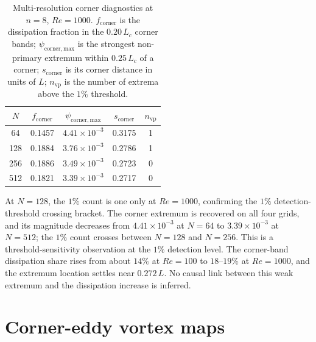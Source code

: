 \documentclass[11pt]{article}
\begin{document}
\begin{table}[H]
\centering
\caption{Multi-resolution corner diagnostics at $n=8$, $Re=1000$.
$f_{\mathrm{corner}}$ is the dissipation fraction in the $0.20\,L_c$ corner
bands; $\psi_{\mathrm{corner,max}}$ is the strongest non-primary extremum within
$0.25\,L_c$ of a corner; $s_{\mathrm{corner}}$ is its corner distance in units
of $L$; $n_{\mathrm{vp}}$ is the number of extrema above the $1\%$ threshold.}




\label{tab:cornerdiag}
\begin{tabular}{ccccc}
\toprule
$N$ & $f_{\mathrm{corner}}$ & $\psi_{\mathrm{corner,max}}$ & $s_{\mathrm{corner}}$ & $n_{\mathrm{vp}}$ \\
\midrule
64 & 0.1457 & $4.41\times10^{-3}$ & 0.3175 & 1 \\
128 & 0.1884 & $3.76\times10^{-3}$ & 0.2786 & 1 \\
256 & 0.1886 & $3.49\times10^{-3}$ & 0.2723 & 0 \\
512 & 0.1821 & $3.39\times10^{-3}$ & 0.2717 & 0 \\
\bottomrule
\end{tabular}
\end{table}
\par

At $N=128$, the $1\%$ count is one only at $Re=1000$, confirming the
$1\%$ detection-threshold crossing bracket. The corner extremum is recovered on
all four grids, and its magnitude decreases from $4.41\times10^{-3}$ at $N=64$
to $3.39\times10^{-3}$ at $N=512$; the $1\%$ count crosses between $N=128$ and
$N=256$. This is a threshold-sensitivity observation at the $1\%$ detection level. The corner-band dissipation share rises from about $14\%$ at
$Re=100$ to $18$--$19\%$ at $Re=1000$, and the extremum location settles near
$0.272\,L$. No causal link between this weak extremum and the dissipation
increase is inferred.

\section{Corner-eddy vortex maps}
\label{sec:corner_maps}
\end{document}
